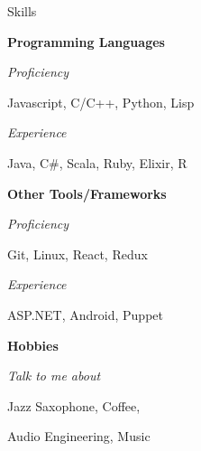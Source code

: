 \begin{minipage}[t]{0.305\textwidth}
  \vspace{10pt}

  {\sectionfont Skills}

  \vspace{5pt}
  \textbf{Programming Languages}
  \begin{adjustwidth}{10pt}{}
    \emph{Proficiency}

    \quad Javascript, C/C++, Python, Lisp

    \emph{Experience}

    \quad Java, C\#, Scala, Ruby, Elixir, R

  \end{adjustwidth}

  \vspace{5pt}
  \textbf{Other Tools/Frameworks}
  \begin{adjustwidth}{10pt}{}
    \emph{Proficiency}

    \quad Git, Linux, React, Redux

    \emph{Experience}

    \quad ASP.NET, Android, Puppet
  \end{adjustwidth}

  \vspace{5pt}
  \textbf{Hobbies}
  \begin{adjustwidth}{10pt}{}
    \emph{Talk to me about}

    \quad Jazz Saxophone, Coffee,

    \quad Audio Engineering, Music
  \end{adjustwidth}















\end{minipage}
